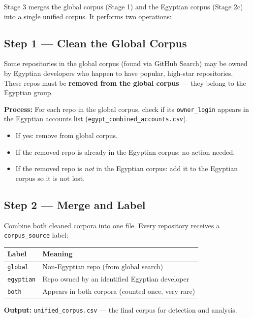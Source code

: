 \documentclass[11pt,a4paper]{article}
\begin{document}
Stage 3 merges the global corpus (Stage 1) and the Egyptian corpus (Stage 2c) into a single unified corpus. It performs two operations:

\subsection{Step 1 — Clean the Global Corpus}

Some repositories in the global corpus (found via GitHub Search) may be owned by Egyptian developers who happen to have popular, high-star repositories. These repos must be \textbf{removed from the global corpus} — they belong to the Egyptian group.

\textbf{Process:} For each repo in the global corpus, check if its \texttt{owner\_login} appears in the Egyptian accounts list (\texttt{egypt\_combined\_accounts.csv}).
\begin{itemize}
    \item If yes: remove from global corpus.
    \item If the removed repo is already in the Egyptian corpus: no action needed.
    \item If the removed repo is \textit{not} in the Egyptian corpus: add it to the Egyptian corpus so it is not lost.
\end{itemize}

\subsection{Step 2 — Merge and Label}

Combine both cleaned corpora into one file. Every repository receives a \texttt{corpus\_source} label:

\begin{center}
\begin{tabular}{ll}
\toprule
\textbf{Label} & \textbf{Meaning} \\
\midrule
\texttt{global} & Non-Egyptian repo (from global search) \\
\texttt{egyptian} & Repo owned by an identified Egyptian developer \\
\texttt{both} & Appears in both corpora (counted once, very rare) \\
\bottomrule
\end{tabular}
\end{center}

\textbf{Output:} \texttt{unified\_corpus.csv} — the final corpus for detection and analysis.
\end{document}
